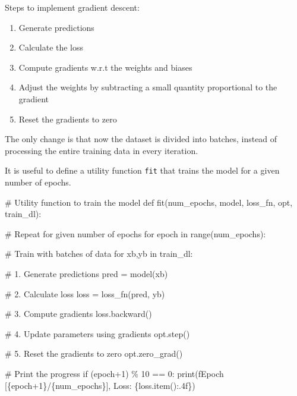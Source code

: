 \documentclass[
  letterpaper,
  DIV=11,
  numbers=noendperiod]{scrartcl}
\newenvironment{Shaded}{\begin{snugshade}}{\end{snugshade}}
\newcommand{\BuiltInTok}[1]{\textcolor[rgb]{0.00,0.23,0.31}{#1}}
\newcommand{\CommentTok}[1]{\textcolor[rgb]{0.37,0.37,0.37}{#1}}
\newcommand{\ControlFlowTok}[1]{\textcolor[rgb]{0.00,0.23,0.31}{#1}}
\newcommand{\DecValTok}[1]{\textcolor[rgb]{0.68,0.00,0.00}{#1}}
\newcommand{\KeywordTok}[1]{\textcolor[rgb]{0.00,0.23,0.31}{#1}}
\newcommand{\NormalTok}[1]{\textcolor[rgb]{0.00,0.23,0.31}{#1}}
\newcommand{\OperatorTok}[1]{\textcolor[rgb]{0.37,0.37,0.37}{#1}}
\newcommand{\SpecialCharTok}[1]{\textcolor[rgb]{0.37,0.37,0.37}{#1}}
\newcommand{\SpecialStringTok}[1]{\textcolor[rgb]{0.13,0.47,0.30}{#1}}
\begin{document}
Steps to implement gradient descent:

\begin{enumerate}
\def\labelenumi{\arabic{enumi}.}
\item
  Generate predictions
\item
  Calculate the loss
\item
  Compute gradients w.r.t the weights and biases
\item
  Adjust the weights by subtracting a small quantity proportional to the
  gradient
\item
  Reset the gradients to zero
\end{enumerate}

The only change is that now the dataset is divided into batches, instead
of processing the entire training data in every iteration.

It is useful to define a utility function \texttt{fit} that trains the
model for a given number of epochs.

\begin{Shaded}
\begin{Highlighting}[]
\CommentTok{\# Utility function to train the model}
\KeywordTok{def}\NormalTok{ fit(num\_epochs, model, loss\_fn, opt, train\_dl):}
    
    \CommentTok{\# Repeat for given number of epochs}
    \ControlFlowTok{for}\NormalTok{ epoch }\KeywordTok{in} \BuiltInTok{range}\NormalTok{(num\_epochs):}
        
        \CommentTok{\# Train with batches of data}
        \ControlFlowTok{for}\NormalTok{ xb,yb }\KeywordTok{in}\NormalTok{ train\_dl:}
            
            \CommentTok{\# 1. Generate predictions}
\NormalTok{            pred }\OperatorTok{=}\NormalTok{ model(xb)}
            
            \CommentTok{\# 2. Calculate loss}
\NormalTok{            loss }\OperatorTok{=}\NormalTok{ loss\_fn(pred, yb)}
            
            \CommentTok{\# 3. Compute gradients}
\NormalTok{            loss.backward()}
            
            \CommentTok{\# 4. Update parameters using gradients}
\NormalTok{            opt.step()}
            
            \CommentTok{\# 5. Reset the gradients to zero}
\NormalTok{            opt.zero\_grad()}
        
        \CommentTok{\# Print the progress}
        \ControlFlowTok{if}\NormalTok{ (epoch}\OperatorTok{+}\DecValTok{1}\NormalTok{) }\OperatorTok{\%} \DecValTok{10} \OperatorTok{==} \DecValTok{0}\NormalTok{:}
            \BuiltInTok{print}\NormalTok{(}\SpecialStringTok{f\textquotesingle{}Epoch [}\SpecialCharTok{\{}\NormalTok{epoch}\OperatorTok{+}\DecValTok{1}\SpecialCharTok{\}}\SpecialStringTok{/}\SpecialCharTok{\{}\NormalTok{num\_epochs}\SpecialCharTok{\}}\SpecialStringTok{], Loss: }\SpecialCharTok{\{}\NormalTok{loss}\SpecialCharTok{.}\NormalTok{item()}\SpecialCharTok{:.4f\}}\SpecialStringTok{\textquotesingle{}}\NormalTok{)}
\end{Highlighting}
\end{Shaded}
\end{document}
